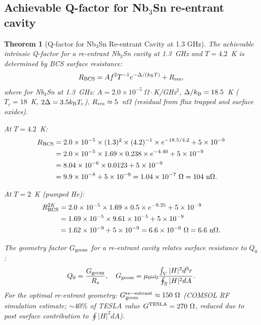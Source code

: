 \documentclass[11pt,twocolumn]{article}
\newcommand{\ee}[1]{\times 10^{#1}}
\newtheorem{theorem}{Theorem}[section]
\begin{document}
\subsection{Achievable Q-factor for Nb$_3$Sn re-entrant cavity}
\label{sec:Q_factor}

\begin{theorem}[Q-factor for Nb$_3$Sn Re-entrant Cavity at 1.3 GHz]
\label{thm:Q_reentrant}
The achievable intrinsic Q-factor for a re-entrant Nb$_3$Sn cavity at
1.3~GHz and $T = 4.2$~K is determined by BCS surface resistance:
\begin{equation}
R_{\rm BCS} = A f^2 T^{-1} e^{-\Delta/(k_{\rm B}T)}
+ R_{\rm res},
\label{eq:R_BCS}
\end{equation}
where for Nb$_3$Sn at 1.3~GHz:
$A = 2.0\ee{-5}~\Omega\cdot$K/GHz$^2$,
$\Delta/k_{\rm B} = 18.5$~K ($T_c = 18$~K, $2\Delta = 3.5k_{\rm B}T_c$),
$R_{\rm res}\approx5$~n$\Omega$ (residual from flux trapped and surface oxides).

At $T = 4.2$~K:
\begin{align}
R_{\rm BCS} &= 2.0\ee{-5}\times(1.3)^2\times(4.2)^{-1}
\times e^{-18.5/4.2} + 5\ee{-9}
\nonumber\\
&= 2.0\ee{-5}\times1.69\times0.238\times e^{-4.40} + 5\ee{-9}
\nonumber\\
&= 8.04\ee{-6}\times0.0123 + 5\ee{-9}
\nonumber\\
&= 9.9\ee{-8} + 5\ee{-9} = 1.04\ee{-7}~\Omega = 104~\text{n}\Omega.
\label{eq:R_BCS_numerical}
\end{align}

At $T = 2$~K (pumped He):
\begin{align}
R_{\rm BCS}^{2K} &= 2.0\ee{-5}\times1.69\times0.5\times e^{-9.25} + 5\ee{-9}
\nonumber\\
&= 1.69\ee{-5}\times9.61\ee{-5} + 5\ee{-9}
\nonumber\\
&= 1.62\ee{-9} + 5\ee{-9} = 6.6\ee{-9}~\Omega = 6.6~\text{n}\Omega.
\label{eq:R_BCS_2K}
\end{align}

The geometry factor $G_{\rm geom}$ for a re-entrant cavity relates
surface resistance to $Q_0$:
\begin{equation}
Q_0 = \frac{G_{\rm geom}}{R_s},
\quad G_{\rm geom} = \mu_0\omega_0
\frac{\int_V |H|^2 d^3r}{\oint_S |H|^2 dA}.
\label{eq:Q0_Ggeom}
\end{equation}
For the optimal re-entrant geometry:
$G_{\rm geom}^{\rm re-entrant} \approx 150~\Omega$ (COMSOL RF simulation
estimate; $\sim 40\%$ of TESLA value $G^{\rm TESLA} = 270~\Omega$,
reduced due to post surface contribution to $\oint|H|^2 dA$).


\end{theorem}
\end{document}
